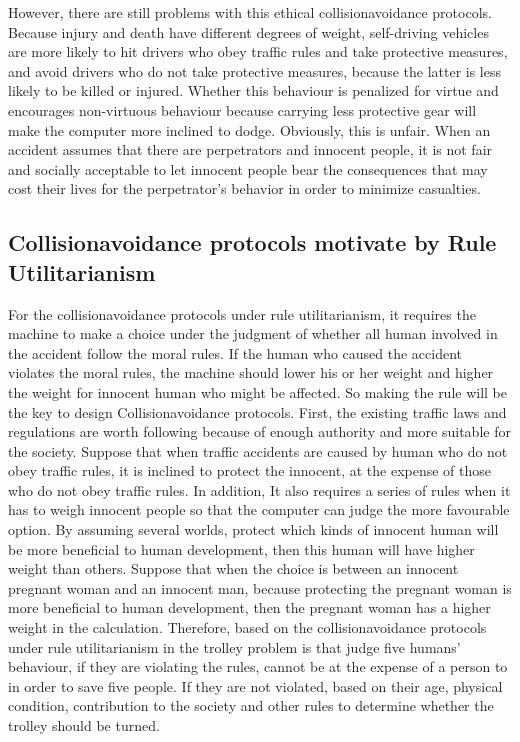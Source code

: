 \documentclass[9pt,twocolumn,twoside,lineno]{gsajnl}
\begin{document}
However, there are still problems with this ethical collisionavoidance protocols.  Because injury and death have different degrees of weight, self-driving vehicles are more likely to hit drivers who obey traffic rules and take protective measures, and avoid drivers who do not take protective measures, because the latter is less likely to be killed or injured.  Whether this behaviour is penalized for virtue and encourages non-virtuous behaviour because carrying less protective gear will make the computer more inclined to dodge.  Obviously, this is unfair.  When an accident assumes that there are perpetrators and innocent people, it is not fair and socially acceptable to let innocent people bear the consequences that may cost their lives for the perpetrator's behavior in order to minimize casualties.

\subsection{Collisionavoidance protocols motivate by Rule Utilitarianism}
For the collisionavoidance protocols under rule utilitarianism, it requires the machine to make a choice under the judgment of whether all human involved in the accident follow the moral rules. If the human who caused the accident violates the moral rules, the machine should lower his or her weight and higher the weight for innocent human who might be affected. So making the rule will be the key to design Collisionavoidance protocols. First, the existing traffic laws and regulations are worth following because of enough authority and more suitable for the society. Suppose that when traffic accidents are caused by human who do not obey traffic rules, it is inclined to protect the innocent, at the expense of those who do not obey traffic rules. In addition, It also requires a series of rules when it has to weigh innocent people so that the computer can judge the more favourable option. By assuming several worlds, protect which kinds of innocent human will be more beneficial to human development, then this human will have higher weight than others. Suppose that when the choice is between an innocent pregnant woman and an innocent man, because protecting the pregnant woman is more beneficial to human development, then the pregnant woman has a higher weight in the calculation. Therefore, based on the collisionavoidance protocols under rule utilitarianism in the trolley problem is that judge five humans' behaviour, if they are violating the rules, cannot be at the expense of a person to in order to save five people. If they are not violated, based on their age, physical condition, contribution to the society and other rules to determine whether the trolley should be turned.
\end{document}
